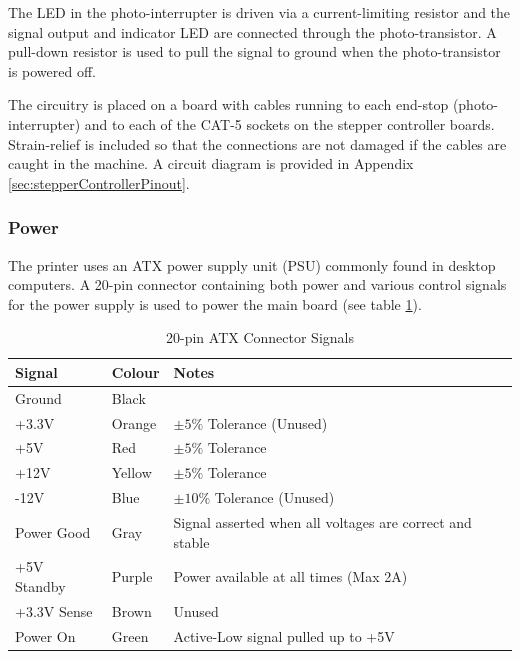 				
				The LED in the photo-interrupter is driven via a current-limiting
				resistor and the signal output and indicator LED are connected through
				the photo-transistor. A pull-down resistor is used to pull the signal
				to ground when the photo-transistor is powered off.
				
				The circuitry is placed on a board with cables running to each end-stop
				(photo-interrupter) and to each of the CAT-5 sockets on the stepper
				controller boards. Strain-relief is included so that the connections are
				not damaged if the cables are caught in the machine. A circuit diagram
				is provided in Appendix \ref{sec:stepperControllerPinout}.
				
				
				
				
			\subsubsection{Power}
				
				The printer uses an ATX power supply unit (PSU) commonly found in
				desktop computers. A 20-pin connector containing both power and various
				control signals for the power supply is used to power the main board
				(see table \ref{tab:atxConnectors}).
				
				\begin{table}[here]
					\centering
					\begin{tabular}{l l l}
						\toprule
						Signal & Colour & Notes\\
						\midrule
						Ground & Black  & \\
						+3.3V  & Orange & $\pm5\%$  Tolerance (Unused) \\
						+5V    & Red    & $\pm5\%$  Tolerance \\
						+12V   & Yellow & $\pm5\%$  Tolerance \\
						-12V   & Blue   & $\pm10\%$ Tolerance (Unused) \\
						\addlinespace
						Power Good  & Gray   & Signal asserted when all voltages are correct
						                       and stable \\
						+5V Standby & Purple & Power available at all times (Max 2A) \\
						+3.3V Sense & Brown  & Unused \\
						Power On    & Green  & Active-Low signal pulled up to +5V \\
						
						\bottomrule
					\end{tabular}
					
					\caption{20-pin ATX Connector Signals\cite{ATX}}
					\label{tab:atxConnectors}
				\end{table}
				
